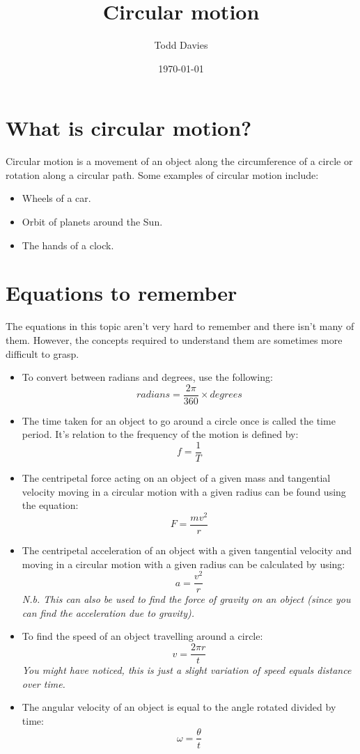 \documentclass{article}
\title{Circular motion}
\author{Todd Davies}
\date{\today}
\begin{document}
\lhead{\today}

\maketitle

\section*{What is circular motion?}
\thispagestyle{empty}
Circular motion is a movement of an object along the circumference of a circle or rotation along a circular path. Some examples of circular motion include:
\begin{itemize}
	\item Wheels of a car.
	\item Orbit of planets around the Sun.
	\item The hands of a clock.
\end{itemize}

\section*{Equations to remember}
\label{sec:Equations To Remember}
The equations in this topic aren't very hard to remember and there isn't many of them. However, the concepts required to understand them are sometimes more difficult to grasp.

\begin{itemize}
	\item To convert between radians and degrees, use the following:
	\[
		radians = \frac{2\pi}{360} \times degrees
	\]
	\item The time taken for an object to go around a circle once is called the time period. It's relation to the frequency of the motion is defined by:
	\[
		f = \frac{1}{T}
	\]
	\item The centripetal force acting on an object of a given mass and tangential velocity moving in a circular motion with a given radius can be found using the equation:
	\[
		F = \frac{mv^2}{r}
	\]
	\item The centripetal acceleration of an object with a given tangential velocity and moving in a circular motion with a given radius can be calculated by using:
	\[
		a = \frac{v^2}{r}
	\]
	\textit{N.b. This can also be used to find the force of gravity on an object (since you can find the acceleration due to gravity).}
	\item To find the speed of an object travelling around a circle:
	\[
		v = \frac{2 \pi r}{t}
	\]
	\textit{You might have noticed, this is just a slight variation of speed equals distance over time.}
	\item The angular velocity of an object is equal to the angle rotated divided by time:
	\[
		\omega = \frac{ \theta }{t}
	\]
\end{itemize}
\end{document}
